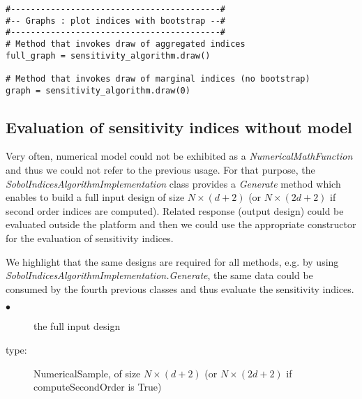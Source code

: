 \begin{lstlisting}
#------------------------------------------#
#-- Graphs : plot indices with bootstrap --#
#------------------------------------------#
# Method that invokes draw of aggregated indices
full_graph = sensitivity_algorithm.draw()

# Method that invokes draw of marginal indices (no bootstrap)
graph = sensitivity_algorithm.draw(0)

\end{lstlisting}




\subsection{Evaluation of sensitivity indices without model}
Very often, numerical model could not be exhibited as a {\itshape NumericalMathFunction} and thus we could not refer to the previous usage. For that purpose, the {\itshape SobolIndicesAlgorithmImplementation} class provides a {\itshape Generate} method which enables to build a full input design of size $N \times (d+2)$ (or $N \times (2d+2)$ if second order indices are computed). Related response (output design) could be evaluated outside the platform and then we could use the appropriate constructor for the evaluation of sensitivity indices.

We highlight that the same designs are required for all methods, e.g. by using {\itshape SobolIndicesAlgorithmImplementation.Generate}, the same data could be consumed by the fourth previous classes and thus evaluate the sensitivity indices.


{
  \begin{description}
  \item[$\bullet$] the full input design
  \item[type:] NumericalSample, of size $N \times (d+2)$ (or $N \times (2d+2)$ if computeSecondOrder is True)
  \end{description}
}

